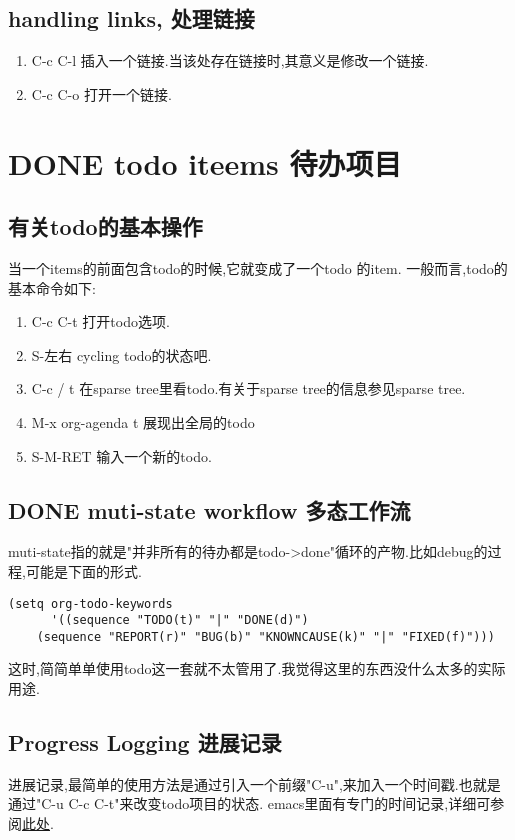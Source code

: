 \documentclass[10pt,a4paper]{article}
\begin{document}
\subsection{handling links, 处理链接}
\label{sec:org5f7501d}
\begin{enumerate}
\item C-c C-l 插入一个链接.当该处存在链接时,其意义是修改一个链接.
\item C-c C-o 打开一个链接.
\end{enumerate}
\section{{\bfseries\sffamily DONE} todo iteems  待办项目}
\label{sec:orga069fbb}
\subsection{有关todo的基本操作}
\label{sec:orgf902297}
当一个items的前面包含todo的时候,它就变成了一个todo 的item.
一般而言,todo的基本命令如下:
\begin{enumerate}
\item C-c C-t 打开todo选项.
\item S-左右 cycling todo的状态吧.
\item C-c / t  在sparse tree里看todo.有关于sparse tree的信息参见sparse tree.
\item M-x org-agenda t 展现出全局的todo
\item S-M-RET 输入一个新的todo.
\end{enumerate}

\subsection{{\bfseries\sffamily DONE} muti-state workflow  多态工作流}
\label{sec:org5b57342}
muti-state指的就是"并非所有的待办都是todo->done"循环的产物.比如debug的过程,可能是下面的形式.


\begin{verbatim}
(setq org-todo-keywords
      '((sequence "TODO(t)" "|" "DONE(d)")
	(sequence "REPORT(r)" "BUG(b)" "KNOWNCAUSE(k)" "|" "FIXED(f)")))

\end{verbatim}


这时,简简单单使用todo这一套就不太管用了.我觉得这里的东西没什么太多的实际用途.
\subsection{Progress Logging 进展记录}
\label{sec:org390dde6}
进展记录,最简单的使用方法是通过引入一个前缀"C-u",来加入一个时间戳.也就是通过"C-u C-c C-t"来改变todo项目的状态.
emacs里面有专门的时间记录,详细可参阅\href{https://orgmode.org/guide/Clocking-Work-Time.html\#Clocking-Work-Time}{此处}.
\end{document}
